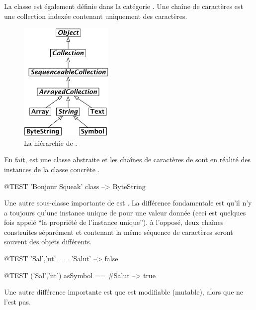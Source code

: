 \documentclass[a4paper,10pt,twoside]{book}
\begin{document}
La classe  est également définie dans la catégorie .  Une chaîne de caractères est une collection indexée contenant uniquement des caractères.

\begin{figure}[ht]
\ifluluelse
	{\centerline {\includegraphics[width=0.4\textwidth]{StringHierarchy}}}
\caption{La hiérarchie de .}
\end{figure}

En fait,  est une classe abstraite et les chaînes de caractères de \pharo sont en réalité des instances de la classe concrète .

\begin{code}{@TEST}
'Bonjour Squeak' class --> ByteString
\end{code}

Une autre sous-classe importante de  est
.  La différence fondamentale est qu'il n'y a
toujours qu'une instance unique de  pour une valeur
donnée  (ceci est quelques fois appelé ``la propriété de
l'instance unique'').  à l'opposé, deux chaînes construites
séparément  et contenant la même séquence de caractères
seront souvent des objets différents.

\begin{code}{@TEST}
'Sal','ut' == 'Salut' --> false
\end{code}

\begin{code}{@TEST}
('Sal','ut') asSymbol == #Salut --> true
\end{code}

\noindent
Une autre différence importante est que  est modifiable (mutable),
alors que  ne l'est pas.
\end{document}
